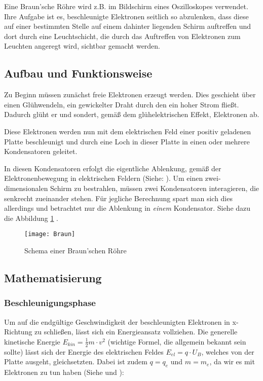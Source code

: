 Eine Braun'sche Röhre wird z.B. im Bildschirm eines Oszilloskopes verwendet. Ihre Aufgabe ist es, beschleunigte Elektronen seitlich so abzulenken, dass diese auf einer bestimmten Stelle auf einem dahinter liegenden Schirm auftreffen und dort durch eine Leuchtschicht, die durch das Auftreffen von Elektronen zum Leuchten angeregt wird, sichtbar gemacht werden.

\subsection{Aufbau und Funktionsweise}

Zu Beginn müssen zunächst freie Elektronen erzeugt werden. Dies geschieht über einen Glühwendeln, ein gewickelter Draht durch den ein hoher Strom fließt. Dadurch glüht er und sondert, gemäß dem glühelektrischen Effekt, Elektronen ab.

Diese Elektronen werden nun mit dem elektrischen Feld einer positiv geladenen Platte beschleunigt und durch eine Loch in dieser Platte in einen oder mehrere Kondensatoren geleitet.

In diesen Kondensatoren erfolgt die eigentliche Ablenkung, gemäß der Elektronenbewegung in elektrischen Feldern (Siehe: ). Um einen zwei-dimensionalen Schirm zu bestrahlen, müssen zwei Kondensatoren interagieren, die senkrecht zueinander stehen. Für jegliche Berechnung spart man sich dies allerdings und betrachtet nur die Ablenkung in \emph{einem} Kondensator. Siehe dazu die Abbildung \ref{fig:BraunscheRoehre} .

\begin{figure}[h!] 
	\centering
	\texttt{[image: Braun]}
	\caption{Schema einer Braun'schen Röhre}
	\label{fig:BraunscheRoehre}
\end{figure}

\subsection{Mathematisierung}

\subsubsection{Beschleunigungsphase}

Um auf die endgültige Geschwindigkeit der beschleunigten Elektronen in x-Richtung zu schließen, lässt sich ein Energieansatz vollziehen. Die generelle kinetische Energie $E_{kin}=\frac{1}{2}m \cdot v^2$ (wichtige Formel, die allgemein bekannt sein sollte) lässt sich der Energie des elektrischen Feldes $E_{el}=q \cdot U_B$, welches von der Platte ausgeht, gleichsetzten. Dabei ist zudem $q = q_e$ und $m = m_e$, da wir es mit Elektronen zu tun haben (Siehe  und ):

